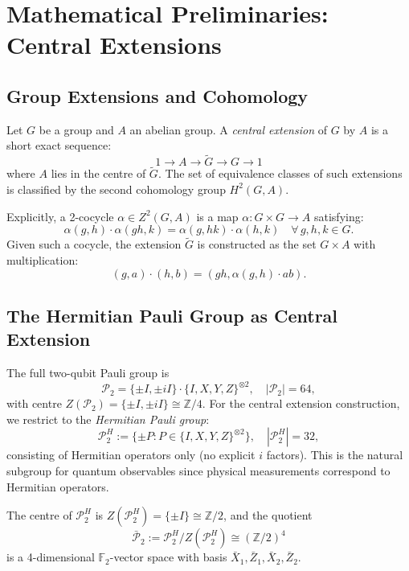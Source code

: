 \documentclass[11pt]{article}
\begin{document}
\section{Mathematical Preliminaries: Central Extensions}
\label{sec:prelim}

\subsection{Group Extensions and Cohomology}

Let $G$ be a group and $A$ an abelian group. A \emph{central extension}
of $G$ by $A$ is a short exact sequence:
\[
  1 \longrightarrow A \longrightarrow \tilde{G}
  \longrightarrow G \longrightarrow 1
\]
where $A$ lies in the centre of $\tilde{G}$. The set of equivalence
classes of such extensions is classified by the second cohomology
group $H^2(G, A)$.

Explicitly, a 2-cocycle $\alpha \in Z^2(G, A)$ is a map
$\alpha: G \times G \to A$ satisfying:
\begin{equation}
\label{eq:cocycle}
  \alpha(g, h) \cdot \alpha(gh, k)
  = \alpha(g, hk) \cdot \alpha(h, k)
  \quad \forall\, g, h, k \in G.
\end{equation}
Given such a cocycle, the extension $\tilde{G}$ is constructed as the
set $G \times A$ with multiplication:
\[
  (g, a) \cdot (h, b) = (gh, \alpha(g, h) \cdot ab).
\]

\subsection{The Hermitian Pauli Group as Central Extension}
\label{sec:pauli-ext}

The full two-qubit Pauli group is
\[
  \mathcal{P}_2 = \{\pm I, \pm iI\} \cdot \{I,X,Y,Z\}^{\otimes 2},
  \quad |\mathcal{P}_2| = 64,
\]
with centre $Z(\mathcal{P}_2) = \{\pm I, \pm iI\} \cong \mathbb{Z}/4$.
For the central extension construction, we restrict to the
\emph{Hermitian Pauli group}:
\[
  \mathcal{P}_2^H := \{\pm P : P \in \{I,X,Y,Z\}^{\otimes 2}\},
  \quad |\mathcal{P}_2^H| = 32,
\]
consisting of Hermitian operators only (no explicit $i$ factors).
This is the natural subgroup for quantum observables since physical
measurements correspond to Hermitian operators.

The centre of $\mathcal{P}_2^H$ is $Z(\mathcal{P}_2^H) = \{\pm I\} \cong \mathbb{Z}/2$,
and the quotient
\[
  \bar{\mathcal{P}}_2 := \mathcal{P}_2^H / Z(\mathcal{P}_2^H)
  \cong (\mathbb{Z}/2)^4
\]
is a 4-dimensional $\mathbb{F}_2$-vector space with basis
$\bar{X}_1, \bar{Z}_1, \bar{X}_2, \bar{Z}_2$.
\end{document}
